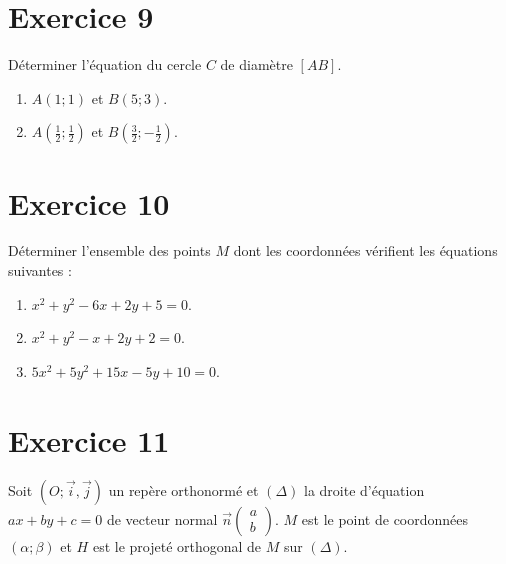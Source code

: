 \documentclass[12pt]{article}
\begin{document}
\section*{Exercice 9}

Déterminer l’équation du cercle $C$ de diamètre $[AB]$.
\begin{enumerate}
    \item $A(1; 1)$ et $B(5; 3)$.
    \item $A\left(\frac{1}{2}; \frac{1}{2}\right)$ et $B\left(\frac{3}{2}; -\frac{1}{2}\right)$.
\end{enumerate}

\section*{Exercice 10}

Déterminer l’ensemble des points $M$ dont les coordonnées vérifient les équations suivantes :
\begin{enumerate}
    \item $x^2 + y^2 - 6x + 2y + 5 = 0$.
    \item $x^2 + y^2 - x + 2y + 2 = 0$.
    \item $5x^2 + 5y^2 + 15x - 5y + 10 = 0$.
\end{enumerate}
\section*{Exercice 11}

Soit $(O; \vec{i}, \vec{j})$ un repère orthonormé et $(\Delta)$ la droite d’équation $ax + by + c = 0$ de vecteur normal $\vec{n}\left(\begin{array}{c}a \\ b\end{array}\right)$.  
$M$ est le point de coordonnées $(\alpha; \beta)$ et $H$ est le projeté orthogonal de $M$ sur $(\Delta)$.
\end{document}

